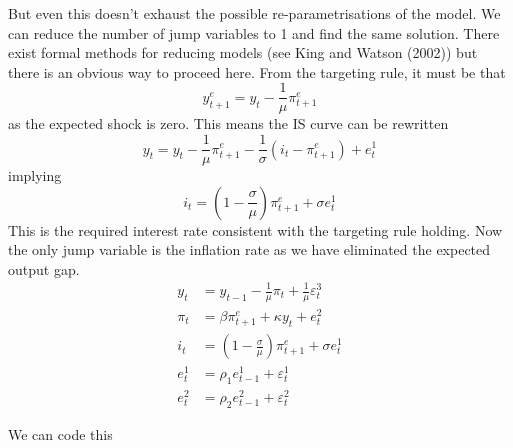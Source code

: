 \documentclass[
  letterpaper,
]{book}
\begin{document}
But even this doesn't exhaust the possible re-parametrisations of the
model. We can reduce the number of jump variables to 1 and find the same
solution. There exist formal methods for reducing models (see King and
Watson (2002)) but there is an obvious way to proceed here. From the
targeting rule, it must be that \[
  y^e_{t+1} = y_t - \frac{1}{\mu}\pi^e_{t+1}
\] as the expected shock is zero. This means the IS curve can be
rewritten \[
y_t = y_t - \frac{1}{\mu}\pi^e_{t+1} - \frac{1}{\sigma} \left (i_t - \pi_{t+1}^e \right ) + e_t^1
\] implying \[
i_t =  \left (1 - \frac{\sigma}{\mu} \right )\pi_{t+1}^e + \sigma e_t^1
\] This is the required interest rate consistent with the targeting rule
holding. Now the only jump variable is the inflation rate as we have
eliminated the expected output gap. \begin{align}
y_t    &= y_{t-1} -\frac{1}{\mu} \pi_t  + \frac{1}{\mu} \varepsilon^3_t \\
\pi_t  &= \beta \pi_{t+1}^e + \kappa y_t + e_t^2 \\
i_t    &= \left (1 - \frac{\sigma}{\mu} \right ) \pi_{t+1}^e + \sigma e_t^1 \\
e_t^1  &= \rho_1 e_{t-1}^1 + \varepsilon_t^1 \\ 
e_t^2  &= \rho_2 e_{t-1}^2 + \varepsilon_t^2 
\end{align}

We can code this
\end{document}
